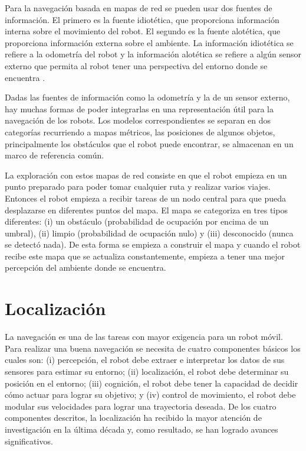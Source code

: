 Para la navegación basada en mapas de red se pueden usar dos fuentes de 
información. El primero es la fuente idiotética, que proporciona información 
interna sobre el movimiento del robot. El segundo es la fuente alotética, que 
proporciona información externa sobre el ambiente. La información idiotética 
se refiere a la odometría del robot y la información alotética se refiere a 
algún sensor externo que permita al robot tener una perspectiva del entorno 
donde se encuentra \cite{thrun2003learning}.

Dadas las fuentes de informaci\'on como la odometr\'ia y la de un sensor 
externo, hay muchas formas de poder integrarlas en una representaci\'on útil 
para la navegaci\'on de los robots. Los modelos correspondientes se separan 
en dos categor\'ias recurriendo a mapas m\'etricos, las posiciones de algunos 
objetos, principalmente los obst\'aculos que el robot puede encontrar, se 
almacenan en un marco de referencia com\'un.

La exploraci\'on con estos mapas de red consiste en que el robot empieza en 
un punto preparado para poder tomar cualquier ruta y realizar varios 
viajes. Entonces el robot empieza a recibir tareas de un nodo central para 
que pueda desplazarse en diferentes puntos del mapa. El mapa se categoriza 
en tres tipos diferentes: (i) un obst\'aculo (probabilidad de ocupaci\'on 
por encima de un umbral), (ii) limpio (probabilidad de ocupaci\'on nulo) y 
(iii) desconocido (nunca se detectó nada). De esta forma se empieza a 
construir el mapa y cuando el robot recibe este mapa que se actualiza 
constantemente, empieza a tener una mejor percepci\'on del ambiente donde 
se encuentra.


\section{Localizaci\'on}
La navegaci\'on es una de las tareas con mayor exigencia para un robot 
móvil. Para realizar una buena navegaci\'on se necesita de cuatro componentes 
b\'asicos los cuales son: (i) percepci\'on, el robot debe extraer e interpretar 
los datos de sus sensores para estimar su entorno; (ii) localizaci\'on, el robot 
debe determinar su posici\'on en el entorno; (iii) cognici\'on, el robot debe tener 
la capacidad de decidir c\'omo actuar para lograr su objetivo; y (iv) control de 
movimiento, el robot debe modular sus velocidades para lograr una trayectoria 
deseada. De los cuatro componentes descritos, la localizaci\'on ha recibido la 
mayor atenci\'on de investigaci\'on en la \'ultima d\'ecada y, como resultado, se 
han logrado avances significativos. %

